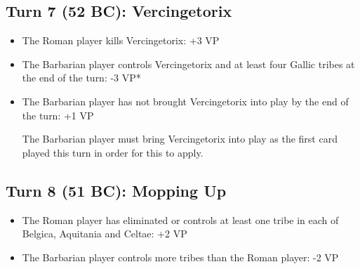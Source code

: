 \subsection{Turn 7 (52 BC): Vercingetorix}
\begin{itemize}
  \setlength\itemsep{0em}
  \item The Roman player kills Vercingetorix: +3 VP
  \item The Barbarian player controls Vercingetorix and at least four Gallic tribes at the end of the turn: -3 VP*
  \item The Barbarian player has not brought Vercingetorix into play by the end of the turn: +1 VP
  
The Barbarian player must bring Vercingetorix into play as the first card played this turn in order for this to apply.
\end{itemize}

\subsection{Turn 8 (51 BC): Mopping Up}
\begin{itemize}
  \setlength\itemsep{0em}
  \item The Roman player has eliminated or controls at least one tribe in each of Belgica, Aquitania and Celtae: +2 VP
  \item The Barbarian player controls more tribes than the Roman player: -2 VP
\end{itemize}
